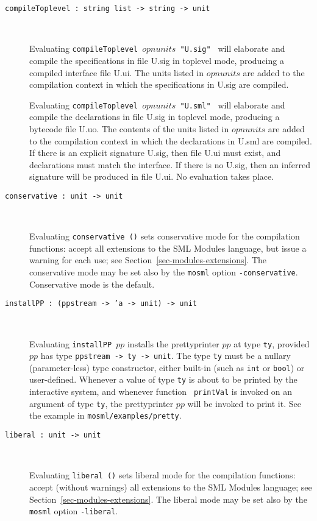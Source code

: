 \documentclass[fleqn,a4paper]{article}
\begin{document}
\begin{description}
\item[{\tt compileToplevel :\ string list -> string -> unit}]\mbox{ }
  
  Evaluating \texttt{compileToplevel $opnunits$ "{\rm U.sig}" }
  will elaborate and compile the specifications in file U.sig in
  toplevel mode, producing a compiled interface file U.ui.  The units
  listed in $opnunits$ are added to the compilation context in
  which the specifications in U.sig are compiled.
  
  Evaluating \texttt{compileToplevel $opnunits$ "{\rm U.sml}"
    } will elaborate and compile the declarations in file U.sig in
  toplevel mode, producing a bytecode file U.uo.  The contents of the
  units listed in $opnunits$ are added to the compilation
  context in which the declarations in U.sml are compiled.  If there
  is an explicit signature U.sig, then file U.ui must exist, and
  declarations must match the interface.  If there is no U.sig, then
  an inferred signature will be produced in file U.ui.  No evaluation
  takes place.

\item[{\tt conservative :\ unit -> unit}]\mbox{ }
  
  Evaluating \texttt{conservative ()} sets conservative mode for the
  compilation functions: accept all extensions to the SML Modules
  language, but issue a warning for each use; see
  Section~\ref{sec-modules-extensions}.  The conservative mode may be
  set also by the \texttt{mosml} option \texttt{-conservative}.
  Conservative mode is the default.

\item[{\tt installPP :\ (ppstream -> 'a -> unit) -> unit}]\mbox{ }

  Evaluating {\tt installPP $pp$} installs the prettyprinter $pp$ at
  type {\tt ty}, provided $pp$ has type {\tt ppstream -> ty -> unit}.
  The type {\tt ty} must be a nullary (parameter-less) type
  constructor, either built-in (such as {\tt int} or {\tt bool}) or
  user-defined.  Whenever a value of type {\tt ty} is about to be
  printed by the interactive system, and whenever function {\tt
    printVal} is invoked on an argument of type {\tt ty}, the
  prettyprinter $pp$ will be invoked to print it.  See the example in
  {\tt mosml/examples/pretty}.

\item[{\tt liberal :\ unit -> unit}]\mbox{ }
  
  Evaluating \texttt{liberal ()} sets liberal mode for the compilation
  functions: accept (without warnings) all extensions to the SML
  Modules language; see Section~\ref{sec-modules-extensions}.  The
  liberal mode may be set also by the \texttt{mosml} option
  \texttt{-liberal}.


\end{description}
\end{document}
